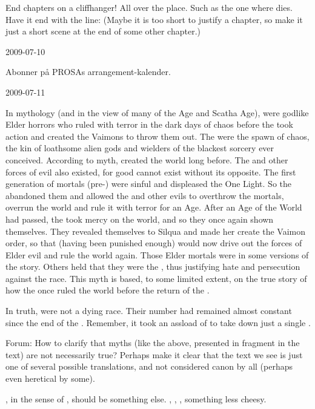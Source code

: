 End chapters on a cliffhanger! 
All over the place.
Such as the one where \Urizeth dies. 
Have it end with the line: 
(Maybe it is too short to justify a chapter, so make it just a short \Teshrial scene at the end of some other chapter.)



2009-07-10 

Abonner på PROSAs arrangement-kalender.



2009-07-11

In \Iquinian mythology (and in the view of many \humanoids of the \Human Age and Scatha Age), \dragons were godlike Elder horrors who ruled \Miith with terror in the dark days of chaos before the \sephiroth took action and created the Vaimons to throw them out.
The \dragons were the spawn of chaos, the kin of loathsome alien gods and wielders of the blackest sorcery ever conceived.
According to myth, \Iquin created the world long before.
The \dragons and other forces of evil also existed, for good cannot exist without its opposite.
The first generation of mortals (pre-\humans) were sinful and displeased the One Light.
So the \sephiroth abandoned them and allowed the \dragons and other evils to overthrow the mortals, overrun the world and rule it with terror for an Age.
After an Age of the World had passed, the \sephiroth took mercy on the world, and so they once again shown themselves.
They revealed themselves to Silqua and made her create the Vaimon order, so that \humans (having been punished enough) would now drive out the forces of Elder evil and rule the world again.
Those Elder mortals were \humans in some versions of the story.
Others held that they were the \nephilim, thus justifying hate and persecution against the \nephil race.
This myth is based, to some limited extent, on the true story of how the \aryothim once ruled the world before the return of the \dragons.

In truth, \dragons were not a dying race.
Their number had remained almost constant since the end of the \secondbanewar.
Remember, it took an assload of \resphain to take down just a single \dragon.

Forum: How to clarify that myths (like the above, presented in fragment in the text) are not necessarily true?
Perhaps make it clear that the text we see is just one of several possible translations, and not considered canon by all (perhaps even heretical by some).

, in the sense of \quo{\Iquin}, should be something else.
, , , something less cheesy.

